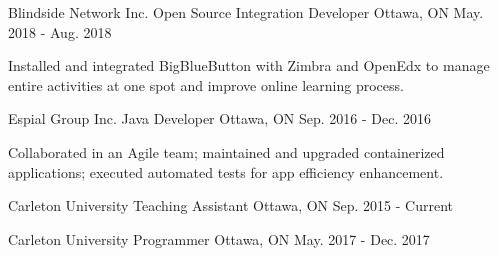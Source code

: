 \begin{cventries}

\cventry
{Blindside Network Inc.}
{Open Source Integration Developer}
{Ottawa, ON}
{May. 2018 - Aug. 2018}
{\begin{cvitems}
    \item {Installed and integrated BigBlueButton with Zimbra and OpenEdx to manage entire activities at one spot and improve online learning process.}
\end{cvitems}}

\cventry
{Espial Group Inc.}
{Java Developer}
{Ottawa, ON}
{Sep. 2016 - Dec. 2016}
{\begin{cvitems}
    \item {Collaborated in an Agile team; maintained and upgraded containerized applications; executed automated tests for app efficiency enhancement.}
\end{cvitems}}

\cventry
{Carleton University}
{Teaching Assistant}
{Ottawa, ON}
{Sep. 2015 - Current}
{\begin{cvitems}
    \item {}
\end{cvitems}}

\cventry
{Carleton University}
{Programmer}
{Ottawa, ON}
{May. 2017 - Dec. 2017}
{\begin{cvitems}
    \item {}
\end{cvitems}}

\end{cventries}
